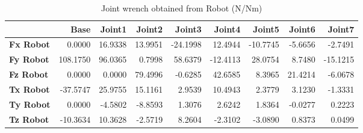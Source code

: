\begin{table}[h!]
	\centering
	\caption{Joint wrench obtained from Robot (N/Nm)}
	\label{wrech_Robot_Pose4}
	\begin{tabular}{|l|r|r|r|r|r|r|r|r|}
		\hline
		\textbf{} & \textbf{Base} & \textbf{Joint1}  & \textbf{Joint2}  & \textbf{Joint3}  & \textbf{Joint4}  & \textbf{Joint5}  & \textbf{Joint6}  & \textbf{Joint7} \\ \hline
		\textbf{Fx Robot}  & 0.0000        & 16.9338        & 13.9951        & -24.1998        & 12.4944        & -10.7745        & -5.6656        & -2.7491 \\ \hline
		\textbf{Fy Robot}  & 108.1750        & 96.0365        & 0.7998        & 58.6379        & -12.4113        & 28.0754        & 8.7480        & -15.1215 \\ \hline
		\textbf{Fz Robot}  & 0.0000        & 0.0000        & 79.4996        & -0.6285        & 42.6585        & 8.3965        & 21.4214        & -6.0678 \\ \hline
		\textbf{Tx Robot}  & -37.5747        & 25.9755        & 15.1161        & 2.9539        & 10.4943        & 2.3779        & 3.1230        & -1.3331 \\ \hline
		\textbf{Ty Robot}  & 0.0000        & -4.5802        & -8.8593        & 1.3076        & 2.6242        & 1.8364        & -0.0277        & 0.2223 \\ \hline
		\textbf{Tz Robot}  & -10.3634        & 10.3628        & -2.5719        & 8.2604        & -2.3102        & -3.0890        & 0.8373        & 0.0499 \\ \hline
	\end{tabular}
\end{table}

